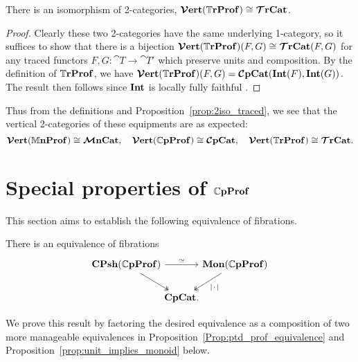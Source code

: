 \documentclass[11pt,oneside,article]{memoir}
\begin{document}
\begin{proposition}
      \label{prop:2iso_traced}
   There is an isomorphism of 2-categories, $\bm{\mathcal{V}}\mathbf{ert}(\mathbb{T}\mathbf{rProf})\cong\bm{\mathcal{T}}\mathbf{rCat}$.
\end{proposition}
\begin{proof}
   Clearly these two 2-categories have the same underlying 1-category, so it suffices to show that
   there is a bijection $\bm{\mathcal{V}}\mathbf{ert}(\mathbb{T}\mathbf{rProf})(F,G)\cong\bm{\mathcal{T}}\mathbf{rCat}(F,G)$ for any traced functors $F,G\colon
   \cat{T}\to \cat{T}'$ which preserve units and composition. By the definition of $\mathbb{T}\mathbf{rProf}$, we have
   $\bm{\mathcal{V}}\mathbf{ert}(\mathbb{T}\mathbf{rProf})(F,G)=\bm{\mathcal{C}}\mathbf{pCat}(\mathbf{Int}(F),\mathbf{Int}(G))$. The result then follows since
   $\mathbf{Int}$ is locally fully faithful \cite{JoyalStreetVerity}.
\end{proof}
Thus from the definitions and Proposition~\ref{prop:2iso_traced}, we see that the vertical 2-categories of these equipments are as expected:
\[\bm{\mathcal{V}}\mathbf{ert}(\mathbb{M}\mathbf{nProf})\cong\bm{\mathcal{M}}\mathbf{nCat},\quad\bm{\mathcal{V}}\mathbf{ert}(\mathbb{C}\mathbf{pProf})\cong\bm{\mathcal{C}}\mathbf{pCat},\quad\bm{\mathcal{V}}\mathbf{ert}(\mathbb{T}\mathbf{rProf})\cong\bm{\mathcal{T}}\mathbf{rCat}.\]



\section{Special properties of $\mathbb{C}\mathbf{pProf}$}
      \label{sec:special_CompProf}

This section aims to establish the following equivalence of fibrations.
\begin{theorem}
      \label{thm:mon_prof_equivalence}
   There is an equivalence of fibrations
   \[ \begin{tikzcd}[column sep=-.5em]
      \CPsh(\dCompProf) \ar[rr,"\equiv"] \ar[dr,two heads]
         && \Mon(\dCompProf) \ar[dl,two heads,"\MOb"] \\
         & \CompCat. &
   \end{tikzcd} \]
\end{theorem}
We prove this result by factoring the desired equivalence as a composition of two more manageable equivalences in Proposition~\ref{Prop:ptd_prof_equivalence} and Proposition~\ref{prop:unit_implies_monoid} below.
\end{document}
